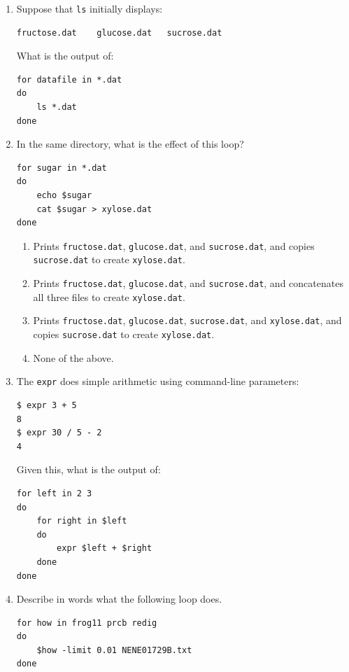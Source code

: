 \documentclass[]{book}
\begin{document}
\begin{enumerate}
\item
  Suppose that \texttt{ls} initially displays:

\begin{verbatim}
fructose.dat    glucose.dat   sucrose.dat
\end{verbatim}

  What is the output of:

\begin{verbatim}
for datafile in *.dat
do
    ls *.dat
done
\end{verbatim}
\item
  In the same directory, what is the effect of this loop?

\begin{verbatim}
for sugar in *.dat
do
    echo $sugar
    cat $sugar > xylose.dat
done
\end{verbatim}

  \begin{enumerate}
  \item
    Prints \texttt{fructose.dat}, \texttt{glucose.dat}, and
    \texttt{sucrose.dat}, and copies \texttt{sucrose.dat} to create
    \texttt{xylose.dat}.
  \item
    Prints \texttt{fructose.dat}, \texttt{glucose.dat}, and
    \texttt{sucrose.dat}, and concatenates all three files to create
    \texttt{xylose.dat}.
  \item
    Prints \texttt{fructose.dat}, \texttt{glucose.dat},
    \texttt{sucrose.dat}, and \texttt{xylose.dat}, and copies
    \texttt{sucrose.dat} to create \texttt{xylose.dat}.
  \item
    None of the above.
  \end{enumerate}
\item
  The \texttt{expr} does simple arithmetic using command-line
  parameters:

\begin{verbatim}
$ expr 3 + 5
8
$ expr 30 / 5 - 2
4
\end{verbatim}

  Given this, what is the output of:

\begin{verbatim}
for left in 2 3
do
    for right in $left
    do
        expr $left + $right
    done
done
\end{verbatim}
\item
  Describe in words what the following loop does.

\begin{verbatim}
for how in frog11 prcb redig
do
    $how -limit 0.01 NENE01729B.txt
done
\end{verbatim}
\end{enumerate}
\end{document}
